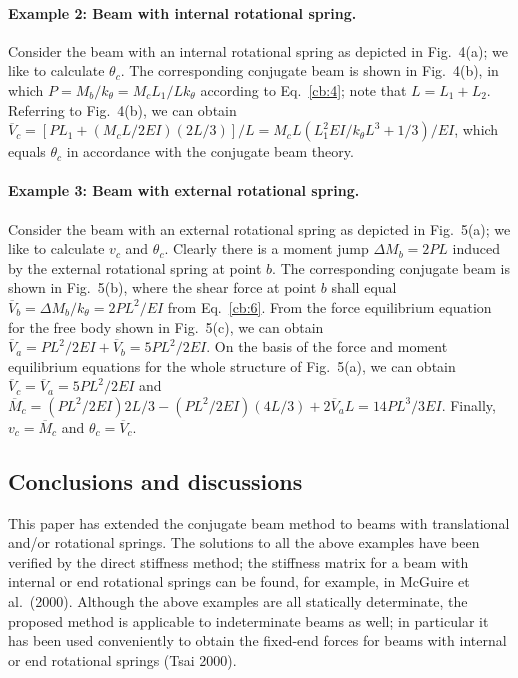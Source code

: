 \paragraph{Example 2: Beam with internal rotational spring.}
Consider the beam with an internal rotational spring as depicted in Fig.~4(a); we like to calculate $\theta_c$. The corresponding conjugate beam is shown in Fig.~4(b), in which $P = M_b/k_\theta = M_cL_1/Lk_\theta$ according to Eq.~\eqref{cb:4}; note that $L = L_1 + L_2$. Referring to Fig.~4(b), we can obtain $\overline V_c = [PL_1 + (M_cL/2EI)(2L/3)]/L = M_cL(L_1^2EI/k_\theta L^3 + 1/3)/EI$, which equals $\theta_c$ in accordance with the conjugate beam theory.
\begin{figure}[H]
  \centering
  
\end{figure}

\paragraph{Example 3: Beam with external rotational spring.}
Consider the beam with an external rotational spring as depicted in Fig.~5(a); we like to calculate $v_c$ and $\theta_c$. Clearly there is a moment jump $\Delta M_b = 2PL$ induced by the external rotational spring at point $b$. The corresponding conjugate beam is shown in Fig.~5(b), where the shear force at point $b$ shall equal $\overline V_b = \Delta M_b/k_\theta = 2PL^2/EI$ from Eq.~\eqref{cb:6}. From the force equilibrium equation for the free body shown in Fig.~5(c), we can obtain $\overline V_a = PL^2/2EI + \overline V_b = 5PL^2/2EI$. On the basis of the force and moment equilibrium equations for the whole structure of Fig.~5(a), we can obtain $\overline V_c = \overline V_a = 5PL^2/2EI$ and $\overline M_c = (PL^2/2EI)2L/3 - (PL^2/2EI)(4L/3) + 2\overline V_aL = 14PL^3/3EI$. Finally, $v_c = \overline M_c$ and $\theta_c = \overline V_c$.
\begin{figure}[H]
  \centering
  
\end{figure}

\subsection*{Conclusions and discussions}
This paper has extended the conjugate beam method to beams with translational and/or rotational springs. The solutions to all the above examples have been verified by the direct stiffness method; the stiffness matrix for a beam with internal or end rotational springs can be found, for example, in McGuire et al.\ (2000). Although the above examples are all statically determinate, the proposed method is applicable to indeterminate beams as well; in particular it has been used conveniently to obtain the fixed-end forces for beams with internal or end rotational springs (Tsai 2000).


